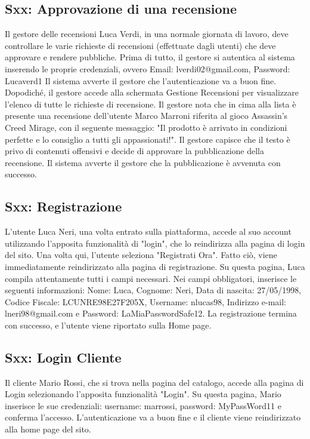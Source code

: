 \documentclass[12pt, a4paper, oneside]{book}
\begin{document}
    \subsection*{Sxx: Approvazione di una recensione}
        Il gestore delle recensioni Luca Verdi, in una normale giornata di lavoro, deve controllare le varie richieste
        di recensioni (effettuate dagli utenti) che deve approvare e rendere pubbliche.
        Prima di tutto, il gestore si autentica al sistema inserendo le proprie credenziali, ovvero Email: lverdi02@gmail.com, Password: Lucaverd1
        Il sistema avverte il gestore che l'autenticazione va a buon fine. Dopodiché, il gestore accede alla schermata
        Gestione Recensioni per visualizzare l'elenco di tutte le richieste di recensione. Il gestore nota che in cima
        alla lista è presente una recensione dell'utente Marco Marroni riferita al gioco Assassin's Creed Mirage,
        con il seguente messaggio: "Il prodotto è arrivato in condizioni perfette e lo consiglio a tutti gli appassionati!".
        Il gestore capisce che il testo è privo di contenuti offensivi e decide di approvare la pubblicazione della recensione.
        Il sistema avverte il gestore che la pubblicazione è avvenuta con successo.

    \subsection*{Sxx: Registrazione}
         L'utente Luca Neri, una volta entrato sulla piattaforma, accede al suo account utilizzando l'apposita funzionalità di "login", che lo
         reindirizza alla pagina di login del sito.
         Una volta qui, l'utente seleziona "Registrati Ora". Fatto ciò, viene immediatamente reindirizzato alla pagina di registrazione.
         Su questa pagina, Luca compila attentamente tutti i campi necessari. Nei campi obbligatori, inserisce le seguenti informazioni:
         Nome: Luca, Cognome: Neri, Data di nascita: 27/05/1998, Codice Fiscale: LCUNRE98E27F205X,
         Username: nlucas98, Indirizzo e-mail: lneri98@gmail.com e Password: LaMiaPasswordSafe12.
         La registrazione termina con successo, e l’utente viene riportato sulla Home page.

    \subsection*{Sxx: Login Cliente}
        Il cliente Mario Rossi, che si trova nella pagina del catalogo, accede alla pagina di Login selezionando l'apposita funzionalità "Login".
        Su questa pagina, Mario inserisce le sue credenziali: username: marrossi, password: MyPassWord11 e conferma l'accesso.
        L'autenticazione va a buon fine e il cliente viene reindirizzato alla home page del sito.
\end{document}
